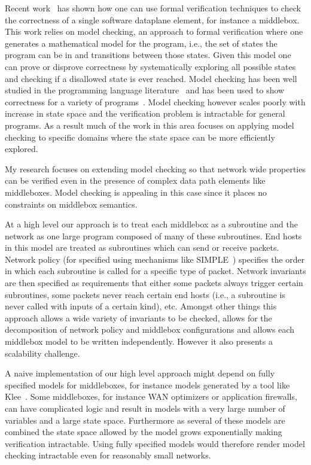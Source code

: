 \documentclass[letterpaper]{article}
\begin{document}
Recent work~\cite{dobrescu2014software} has shown how one can use formal verification techniques to check the
correctness of a single software dataplane element, for instance a middlebox. This work relies on model
checking, an approach to formal verification where one generates a mathematical model for the program, i.e.,
the set of states the program can be in and transitions between those states. Given this model one can prove
or disprove correctness by systematically exploring all possible states and checking if a disallowed state is
ever reached. Model checking has been well studied in the programming language
literature~\cite{jhala2009software, han2007providing} and has been used to show correctness for a variety of
programs~\cite{cadar2008klee, klein2009sel4}.  Model checking however scales poorly with increase in state
space and the verification problem is intractable for general programs. As a result much of the work in this
area focuses on applying model checking to specific domains where the state space can be more efficiently
explored. 

My research focuses on extending model checking so that network wide properties can be verified even in the
presence of complex data path elements like middleboxes. Model checking is appealing in this case since it
places no constraints on middlebox semantics. 

At a high level our approach is to treat each middlebox as a subroutine and the network as one large program
composed of many of these subroutines. End hosts in this model are treated as subroutines which can send or
receive packets.  Network policy (for specified using mechanisms like SIMPLE~\cite{qazi2013simple}) specifies
the order in which each subroutine is called for a specific type of packet. Network invariants are then
specified as requirements that either some packets always trigger certain subroutines, some packets never
reach certain end hosts (i.e., a subroutine is never called with inputs of a certain kind), etc. Amongst other
things this approach allows a wide variety of invariants to be checked, allows for the decomposition of
network policy and middlebox configurations and allows each middlebox model to be written independently.
However it also presents a scalability challenge.

A naive implementation of our high level approach might depend on fully specified models for middleboxes, for
instance models generated by a tool like Klee~\cite{cadar2008klee}. Some middleboxes, for instance WAN
optimizers or application firewalls, can have complicated logic and result in models with a very large number
of variables and a large state space. Furthermore as several of these models are combined the state space
allowed by the model grows exponentially making verification intractable. Using fully specified models would
therefore render model checking intractable even for reasonably small networks.
\end{document}
